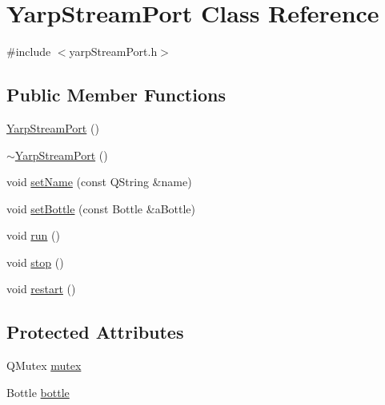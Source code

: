 \hypertarget{class_yarp_stream_port}{
\section{YarpStreamPort Class Reference}
\label{class_yarp_stream_port}
}


{\ttfamily \#include $<$yarpStreamPort.h$>$}\subsection*{Public Member Functions}
\begin{DoxyCompactItemize}
\item 
\hyperlink{class_yarp_stream_port_aa9bc88cfd89f533676960ba59629af84}{YarpStreamPort} ()
\item 
\hyperlink{class_yarp_stream_port_ac0923822f1b4ab48ef2fd7600184be98}{$\sim$YarpStreamPort} ()
\item 
void \hyperlink{class_yarp_stream_port_a82197dfe08009bf57b9892ba8c091bbc}{setName} (const QString \&name)
\item 
void \hyperlink{class_yarp_stream_port_a6c55a434cf560c89f93d1a7d02b42a98}{setBottle} (const Bottle \&aBottle)
\item 
void \hyperlink{class_yarp_stream_port_aaeea4c0a2bae6c5a257935227df3cddb}{run} ()
\item 
void \hyperlink{class_yarp_stream_port_ae1c105a567b759d0f0c0c0068e0279a1}{stop} ()
\item 
void \hyperlink{class_yarp_stream_port_acc997d769ece47a6c88b1437225c0039}{restart} ()
\end{DoxyCompactItemize}
\subsection*{Protected Attributes}
\begin{DoxyCompactItemize}
\item 
QMutex \hyperlink{class_yarp_stream_port_afe137a99b998f77163794f17f87c1af6}{mutex}
\item 
Bottle \hyperlink{class_yarp_stream_port_a02845704378d6350813b496589403cd7}{bottle}
\end{DoxyCompactItemize}


